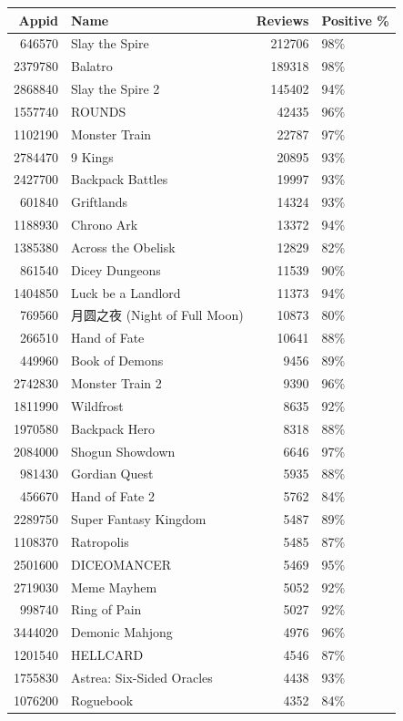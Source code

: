\documentclass[11pt,letterpaper]{report}
\begin{document}
\begin{center}
\begin{tabular}{rlrl}
Appid & Name & Reviews & Positive \%\\
\hline
646570 & Slay the Spire & 212706 & 98\%\\
2379780 & Balatro & 189318 & 98\%\\
2868840 & Slay the Spire 2 & 145402 & 94\%\\
1557740 & ROUNDS & 42435 & 96\%\\
1102190 & Monster Train & 22787 & 97\%\\
2784470 & 9 Kings & 20895 & 93\%\\
2427700 & Backpack Battles & 19997 & 93\%\\
601840 & Griftlands & 14324 & 93\%\\
1188930 & Chrono Ark & 13372 & 94\%\\
1385380 & Across the Obelisk & 12829 & 82\%\\
861540 & Dicey Dungeons & 11539 & 90\%\\
1404850 & Luck be a Landlord & 11373 & 94\%\\
769560 & 月圆之夜 (Night of Full Moon) & 10873 & 80\%\\
266510 & Hand of Fate & 10641 & 88\%\\
449960 & Book of Demons & 9456 & 89\%\\
2742830 & Monster Train 2 & 9390 & 96\%\\
1811990 & Wildfrost & 8635 & 92\%\\
1970580 & Backpack Hero & 8318 & 88\%\\
2084000 & Shogun Showdown & 6646 & 97\%\\
981430 & Gordian Quest & 5935 & 88\%\\
456670 & Hand of Fate 2 & 5762 & 84\%\\
2289750 & Super Fantasy Kingdom & 5487 & 89\%\\
1108370 & Ratropolis & 5485 & 87\%\\
2501600 & DICEOMANCER & 5469 & 95\%\\
2719030 & Meme Mayhem & 5052 & 92\%\\
998740 & Ring of Pain & 5027 & 92\%\\
3444020 & Demonic Mahjong & 4976 & 96\%\\
1201540 & HELLCARD & 4546 & 87\%\\
1755830 & Astrea: Six-Sided Oracles & 4438 & 93\%\\
1076200 & Roguebook & 4352 & 84\%\\

\end{tabular}
\end{center}
\end{document}
